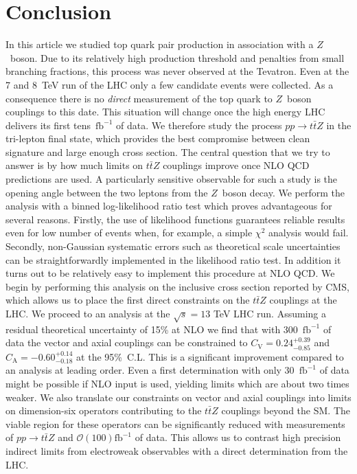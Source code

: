 \documentclass{JHEP3}
\def\ttbZ{t\bar{t}Z}
\def\invfb {\mathrm{fb}^{-1}}
\begin{document}
\section{Conclusion}
In this article we studied top quark pair production in association with a $Z$~boson.
Due to its relatively high production threshold and 
penalties from small branching fractions, 
this process was never observed at the Tevatron.
Even at the 7 and 8~TeV run of the LHC only a few candidate events were collected.
As a consequence there is no {\it direct} measurement of the top quark to $Z$~boson couplings to this date. 
This situation will change once the high energy LHC delivers its first tens~$\invfb$ of data.
We therefore study the process $pp\to\ttbZ$ in the tri-lepton final state,   
which provides the best compromise between clean signature and large enough cross section. 
The central question that we try to answer is by how much limits on
$\ttbZ$ couplings improve once NLO QCD predictions are used.
A particularly sensitive observable for such a study is the opening angle between the two leptons from the $Z$~boson decay.
We perform the analysis with a binned log-likelihood ratio test which proves advantageous for several reasons.
Firstly, the use of likelihood functions guarantees reliable results even for low number of events when, for example, a simple $\chi^2$ analysis would fail.
Secondly, non-Gaussian systematic errors such as theoretical scale uncertainties can be straightforwardly implemented in the likelihood ratio test.
In addition it turns out to be relatively easy to implement this procedure at NLO QCD.
We begin by performing this analysis on the inclusive cross section reported by CMS, which allows us to place the first direct constraints on the $\ttbZ$ couplings at the LHC. 
We proceed to an analysis at the $\sqrt{s}=13$ TeV LHC run.
Assuming a residual theoretical uncertainty of 15\% at NLO we find that with 300~$\invfb$ of data the vector and axial couplings can 
be constrained to $C_\mathrm{V}=0.24^{+0.39}_{-0.85}$ and $C_\mathrm{A}=-0.60^{+0.14}_{-0.18}$ at the 95\%~C.L.
This is a significant improvement compared to an analysis at leading order.
Even a first determination with only 30~$\invfb$ of data might be possible if NLO input is used, yielding 
limits which are about two times weaker. 
We also translate our constraints on vector and axial couplings into limits on dimension-six operators contributing to the $\ttbZ$ couplings beyond the SM.
The viable region for these operators can be significantly reduced with measurements of $pp \to \ttbZ$ and $\mathcal{O}(100)\invfb$ of data.
This allows us to contrast high precision indirect limits from electroweak observables with a direct determination from the LHC.
\end{document}
